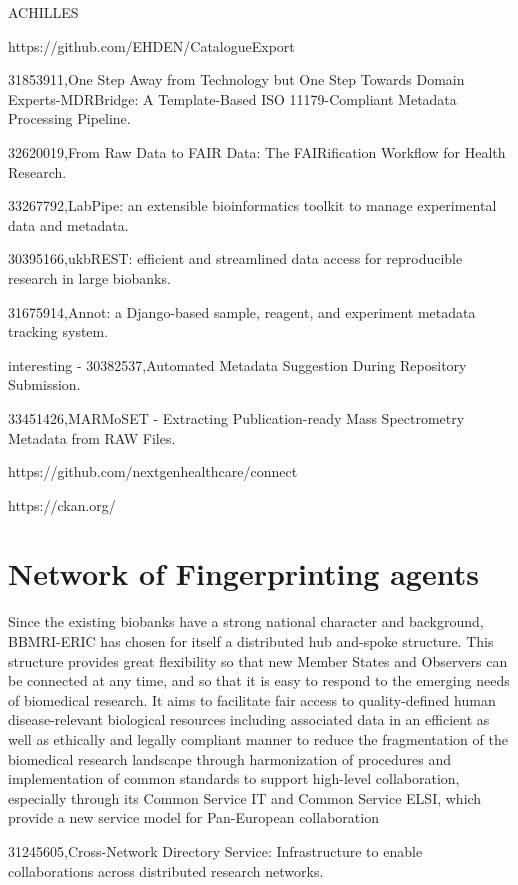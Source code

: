 ACHILLES

https://github.com/EHDEN/CatalogueExport

31853911,One Step Away from Technology but One Step Towards Domain Experts-MDRBridge: A Template-Based ISO 11179-Compliant Metadata Processing Pipeline.

32620019,From Raw Data to FAIR Data: The FAIRification Workflow for Health Research.

33267792,LabPipe: an extensible bioinformatics toolkit to manage experimental data and metadata.

30395166,ukbREST: efficient and streamlined data access for reproducible research in large biobanks.

31675914,Annot: a Django-based sample, reagent, and experiment metadata tracking system.

interesting - 30382537,Automated Metadata Suggestion During Repository Submission.

33451426,MARMoSET - Extracting Publication-ready Mass Spectrometry Metadata from RAW Files.

https://github.com/nextgenhealthcare/connect

https://ckan.org/

\section{Network of Fingerprinting agents}
\cite{datasphere}
\cite{ehr4cr}
\cite{popmed}
\cite{gaain}

\cite{bbmieric} Since the existing biobanks have a strong national character and background, BBMRI-ERIC has chosen for itself a distributed hub and-spoke structure. This structure provides great flexibility so that new Member States and Observers can be connected at any time, and so that it is easy to respond to the emerging needs of biomedical research. It aims to facilitate fair access to quality-defined human disease-relevant biological resources including associated data in an efficient as well as ethically and legally compliant manner to reduce the fragmentation of the biomedical research landscape through harmonization of procedures and implementation of common standards to support high-level collaboration, especially through its Common Service IT and Common Service ELSI, which provide a new service model for Pan-European collaboration

31245605,Cross-Network Directory Service: Infrastructure to enable collaborations across distributed research networks.

